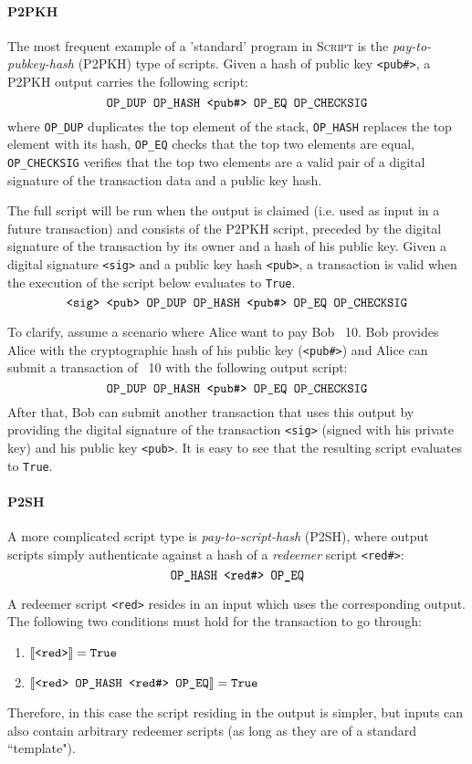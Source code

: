 \documentclass[acmsmall,nonacm=true,screen=true]{acmart}
\begin{document}
\newcommand\ttt{\texttt}
\newcommand\stack[1]{\text{\ttt{#1}}}
\newcommand\Semantics[1]{\llbracket \stack{#1} \rrbracket}

\paragraph{P2PKH}
The most frequent example of a 'standard' program in \textsc{Script} is the
\textit{pay-to-pubkey-hash} (P2PKH) type of scripts. Given a hash of public key \texttt{<pub\#>},
a P2PKH output carries the following script:
\[
  \stack{OP\_DUP OP\_HASH <pub\#> OP\_EQ OP\_CHECKSIG}
\]
where \ttt{OP\_DUP} duplicates the top element of the stack, \ttt{OP\_HASH} replaces the top element with its hash,
\ttt{OP\_EQ} checks that the top two elements are equal, \ttt{OP\_CHECKSIG} verifies that the top two elements
are a valid pair of a digital signature of the transaction data and a public key hash.

The full script will be run when the output is claimed (i.e. used as input in a future transaction)
and consists of the P2PKH script, preceded by the digital signature of the transaction by its owner and a hash of
his public key. Given a digital signature \ttt{<sig>} and a public key hash \ttt{<pub>}, a transaction is valid
when the execution of the script below evaluates to \ttt{True}.
\[
  \stack{<sig> <pub> OP\_DUP OP\_HASH <pub\#> OP\_EQ OP\_CHECKSIG}
\]

To clarify, assume a scenario where Alice want to pay Bob \bitcoin ~10.
Bob provides Alice with the cryptographic hash of his public key (\ttt{<pub\#>})
and Alice can submit a transaction of \bitcoin ~10 with the following output script:
\[
  \stack{OP\_DUP OP\_HASH <pub\#> OP\_EQ OP\_CHECKSIG}
\]
After that, Bob can submit another transaction that uses this output by providing the digital signature
of the transaction \ttt{<sig>} (signed with his private key) and his public key \ttt{<pub>}.
It is easy to see that the resulting script evaluates to \ttt{True}.

\paragraph{P2SH}
A more complicated script type is \textit{pay-to-script-hash} (P2SH), where output scripts simply authenticate
against a hash of a \textit{redeemer} script \ttt{<red\#>}:
\[
  \stack{OP\_HASH <red\#> OP\_EQ}
\]

A redeemer script \ttt{<red>} resides in an input which uses the corresponding output. The following two conditions
must hold for the transaction to go through:
\begin{enumerate}
\item $\Semantics{<red>} = \stack{True}$
\item $\Semantics{<red> OP\_HASH <red\#> OP\_EQ} = \stack{True}$
\end{enumerate}
Therefore, in this case the script residing in the output is simpler, but inputs can also contain arbitrary redeemer scripts
(as long as they are of a standard ``template").
\end{document}
